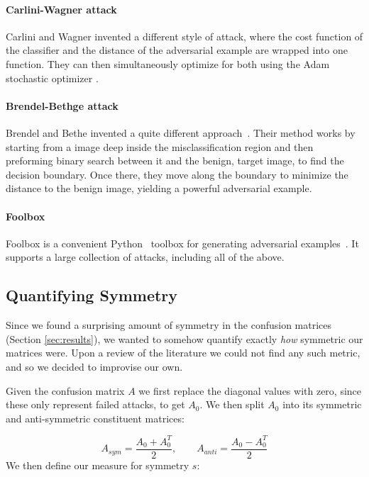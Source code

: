 \documentclass{article}
\begin{document}

\paragraph{Carlini-Wagner attack}
Carlini and Wagner \cite{carlini2017towards} invented a different style of attack, where the cost function of the classifier and the distance of the adversarial example are wrapped into one function. They can then simultaneously optimize for both using the Adam stochastic optimizer \cite{kingma2017adam}.

\paragraph{Brendel-Bethge attack}
Brendel and Bethe invented a quite different approach~\cite{brendel2019accurate}.
Their method works by starting from a image deep inside the misclassification region and then preforming binary search between it and the benign, target image, to find the decision boundary. Once there, they move along the boundary to minimize the distance to the benign image, yielding a powerful adversarial example.

\paragraph{Foolbox}
Foolbox is a convenient Python~\cite{van1995python} toolbox for generating adversarial examples~\cite{rauber2017foolbox}. It supports a large collection of attacks, including all of the above.

\subsection{Quantifying Symmetry}

Since we found a surprising amount of symmetry in the confusion matrices (Section \ref{sec:results}), we wanted to somehow quantify exactly \textit{how} symmetric our matrices were. Upon a review of the literature we could not find any such metric, and so we decided to improvise our own.

Given the confusion matrix $A$ we first replace the diagonal values with zero, since these only represent failed attacks, to get $A_0$. We then split $A_0$ into its symmetric and anti-symmetric constituent matrices:

\begin{equation}
	A_{sym} = \frac{A_0 + A_0^T}{2}, \qquad
	A_{anti} = \frac{A_0 - A_0^T}{2}
\end{equation}
We then define our measure for symmetry $s$:
\end{document}
